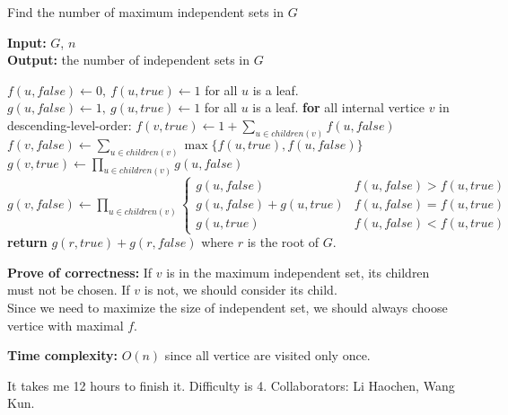 \documentclass{oxmathproblems}
\begin{document}
\begin{questions}
\begin{parts}
\begin{algorithm}
    \caption{Find the number of maximum independent sets in $G$}
    \textbf{Input:} $G$, $n$\\
    \textbf{Output:} the number of independent sets in $G$
    \begin{algorithmic}[1]
        \State $f(u,false)\gets 0,\ f(u,true)\gets 1$ for all $u$ is a leaf.\;
        \State $g(u,false)\gets 1,\ g(u,true)\gets 1$ for all $u$ is a leaf.\;
        \State \textbf{for} all internal vertice $v$ in descending-level-order:\;
        \State \hspace{0.5cm} $f(v,true)\gets 1+\sum_{u\in children(v)}f(u,false)$\;
        \State \hspace{0.5cm} $f(v,false)\gets\sum_{u\in children(v)}\max\{f(u,true),f(u,false)\}$\;
        \State \hspace{0.5cm} $g(v,true)\gets\prod_{u\in children(v)}g(u,false)$
        \State \hspace{0.5cm} $g(v,false)\gets\prod_{u\in children(v)}\begin{cases}
            g(u,false) & f(u,false)>f(u,true)\\
            g(u,false)+g(u,true) & f(u,false)=f(u,true)\\
            g(u,true) & f(u,false)<f(u,true)
        \end{cases}$
        \State \textbf{return} $g(r,true)+g(r,false)$ where $r$ is the root of $G$.
\end{algorithmic}
\end{algorithm}
\hspace{-1cm}\textbf{Prove of correctness:} If $v$ is in the maximum independent set, its children must not be chosen. If $v$ is not, we should consider its child.\\
Since we need to maximize the size of independent set, we should always choose vertice with maximal $f$.
\par\hspace{-1cm}\textbf{Time complexity:} $O(n)$ since all vertice are visited only once.
\end{parts}

\miquestion It takes me 12 hours to finish it. Difficulty is 4. Collaborators: Li Haochen, Wang Kun.
\end{questions}
\end{document}
